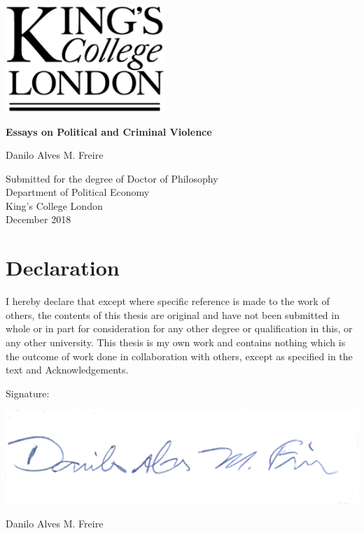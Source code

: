 \documentclass[a4paper,12pt]{report}
\begin{document}


\thispagestyle{empty}
\begin{center}
\includegraphics[width=6cm]{images/kcl.eps}
\end{center}	
\vskip40mm
\begin{center}

\huge\textbf{Essays on Political and Criminal Violence}
\vskip2mm
\vskip5mm

\Large Danilo Alves M. Freire
\normalsize
\vfill
\large

Submitted for the degree of Doctor of Philosophy \\
Department of Political Economy \\
King's College London	\\

December 2018
\end{center}	

\chapter*{Declaration}
\noindent 
I hereby declare that except where specific reference is made to the work of others, the contents of this thesis are original and have not been submitted in whole or in part for consideration for any other degree or qualification in this, or any other university. This thesis is my own work and contains nothing which is the outcome of work done in collaboration with others, except as specified in the text and Acknowledgements. 

\vskip20mm
\noindent
Signature:
\vskip10mm
\begin{flushleft}
\includegraphics[scale=.25]{images/sig.pdf}
\end{flushleft}
\noindent 
Danilo Alves M. Freire
\end{document}
